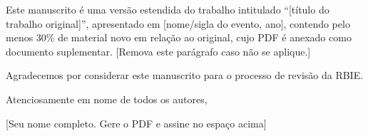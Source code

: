 \documentclass[11pt,a4paper,brazilian]{article}
\begin{document}
Este manuscrito é uma versão estendida do trabalho intitulado ``[título do trabalho original]'', apresentado em [nome/sigla do evento, ano], contendo pelo menos 30\% de material novo em relação ao original, cujo PDF é anexado como documento suplementar. [Remova este parágrafo caso não se aplique.]

\bigskip
Agradecemos por considerar este manuscrito para o processo de revisão da RBIE.

Atenciosamente em nome de todos os autores,

\vspace{2.5cm}

[Seu nome completo. Gere o PDF e assine no espaço acima]
\end{document}
